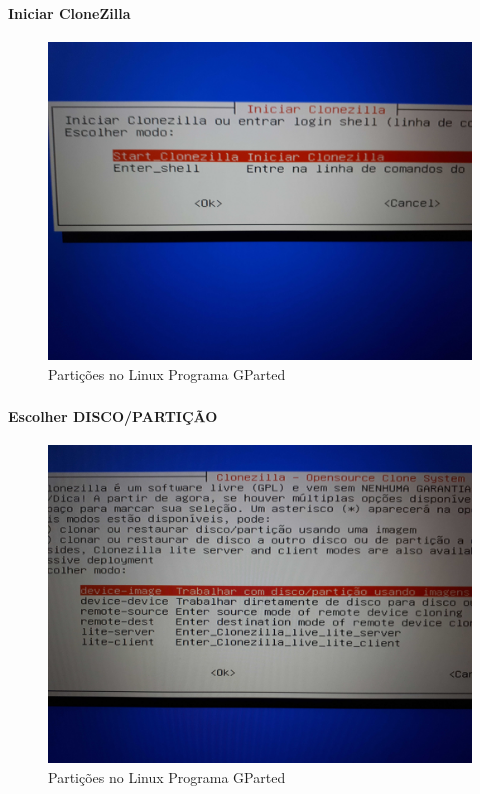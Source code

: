 \documentclass{beamer}
\begin{document}
\begin{frame}[plain,c]
   \frametitle{\insertsection}
    \framesubtitle{Iniciar CloneZilla}
    \begin{figure}[!h]
        
        \includegraphics[width=1\linewidth]{images/backup/bkp5.jpg}
        \caption{Partições no Linux Programa GParted}
    \end{figure}
\end{frame}


\begin{frame}[plain,c]
   \frametitle{\insertsection}
    \framesubtitle{Escolher DISCO/PARTIÇÃO}
    \begin{figure}[!h]
        
        \includegraphics[width=1\linewidth]{images/backup/bkp6.jpg}
        \caption{Partições no Linux Programa GParted}
    \end{figure}
\end{frame}
\end{document}
